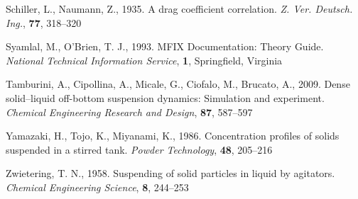 \begin{thebibliography}{99}
 Schiller, L., Naumann, Z., 1935. A drag coefficient correlation. \textit{Z. Ver. Deutsch. Ing.}, \textbf{77}, 318--320

 Syamlal, M., O'Brien, T. J., 1993. MFIX Documentation: Theory Guide. \textit{National Technical Information Service}, \textbf{1}, Springfield, Virginia 

 Tamburini, A., Cipollina, A., Micale, G., Ciofalo, M., Brucato, A., 2009. Dense solid–liquid off-bottom suspension dynamics: Simulation and experiment. \textit{Chemical Engineering Research and Design}, \textbf{87}, 587--597

 Yamazaki, H., Tojo, K., Miyanami, K., 1986. Concentration profiles of solids suspended in a stirred tank. \textit{Powder Technology}, \textbf{48}, 205--216

 Zwietering, T. N., 1958. Suspending of solid particles in liquid by agitators. \textit{Chemical Engineering Science}, \textbf{8}, 244--253 

\end{thebibliography}
